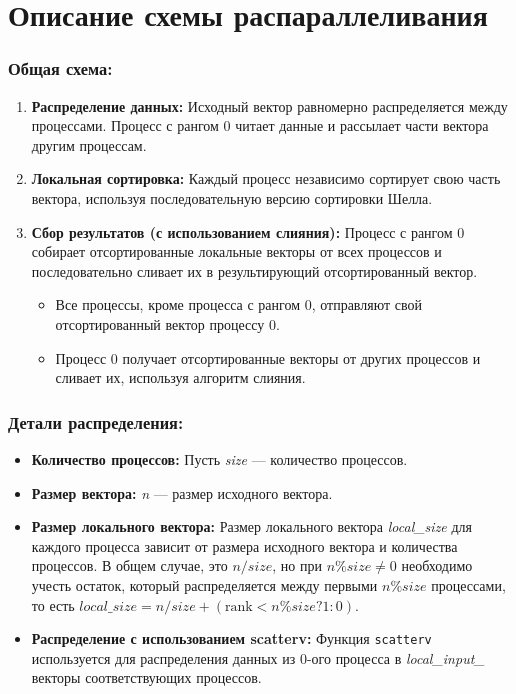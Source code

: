 \documentclass[12pt]{article}
\begin{document}
\section{Описание схемы распараллеливания}
\subsubsection*{Общая схема:}
\begin{enumerate}
    \item \textbf{Распределение данных:} Исходный вектор равномерно распределяется между процессами. Процесс с рангом 0 читает данные и рассылает части вектора другим процессам.
    \item \textbf{Локальная сортировка:} Каждый процесс независимо сортирует свою часть вектора, используя последовательную версию сортировки Шелла.
    \item \textbf{Сбор результатов (с использованием слияния):} Процесс с рангом 0 собирает отсортированные локальные векторы от всех процессов и последовательно сливает их в результирующий отсортированный вектор.
    \begin{itemize}
        \item Все процессы, кроме процесса с рангом 0, отправляют свой отсортированный вектор процессу 0.
        \item Процесс 0 получает отсортированные векторы от других процессов и сливает их, используя алгоритм слияния.
    \end{itemize}
\end{enumerate}

\subsubsection*{Детали распределения:}

\begin{itemize}
    \item \textbf{Количество процессов:} Пусть \textit{size} — количество процессов.
    \item \textbf{Размер вектора:} \textit{n} — размер исходного вектора.
    \item \textbf{Размер локального вектора:} Размер локального вектора \textit{local\_size} для каждого процесса зависит от размера исходного вектора и количества процессов. В общем случае, это $n / size$, но при $n \% size \ne 0$ необходимо учесть остаток, который распределяется между первыми $n \% size$ процессами, то есть $local\_size = n/size + (\text{rank} < n \% size ? 1 : 0)$.
    \item \textbf{Распределение с использованием scatterv:} Функция \texttt{scatterv} используется для распределения данных из 0-ого процесса в \textit{local\_input\_} векторы соответствующих процессов.
\end{itemize}
\end{document}
